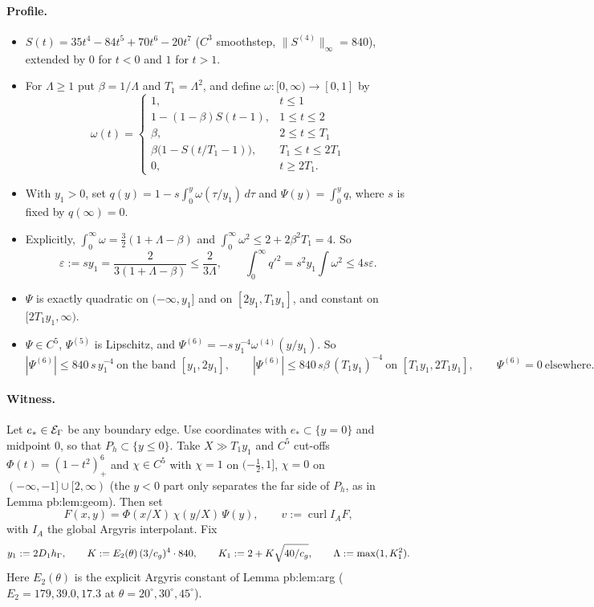 \documentclass[11pt]{article}
\theoremstyle{remark}\newtheorem{remark}[theorem]{Remark}
\newcommand{\norm}[1]{\|#1\|}\newcommand{\ip}[2]{\langle #1,#2\rangle}\DeclareMathOperator{\curl}{curl}\DeclareMathOperator{\diam}{diam}
\begin{document}
\paragraph{Profile.}
\begin{itemize}
\item $S(t)=35t^4-84t^5+70t^6-20t^7$ ($C^3$ smoothstep, $\norm{S^{(4)}}_\infty=840$), extended by $0$ for $t<0$ and $1$ for
  $t>1$.
\item For $\Lambda\ge1$ put $\beta=1/\Lambda$ and $T_1=\Lambda^2$, and define $\omega:[0,\infty)\to[0,1]$ by
\[\omega(t)=\begin{cases}1,&t\le1\\ 1-(1-\beta)S(t-1),&1\le t\le2\\ \beta,&2\le t\le T_1\\ \beta\bigl(1-S(t/T_1-1)\bigr),&T_1\le t\le2T_1\\ 0,&t\ge2T_1 .\end{cases}\]
\item With $y_1>0$, set $q(y)=1-s\int_0^y\omega(\tau/y_1)\,d\tau$ and $\Psi(y)=\int_0^yq$, where $s$ is fixed by $q(\infty)=0$.
\item Explicitly, $\int_0^\infty\omega=\frac32(1+\Lambda-\beta)$ and $\int_0^\infty\omega^2\le2+2\beta^2T_1=4$. So
\[\varepsilon:=sy_1=\frac{2}{3(1+\Lambda-\beta)}\le\frac2{3\Lambda},\qquad \int_0^\infty q'^2=s^2y_1\!\int\omega^2\le4s\varepsilon .\]
\item $\Psi$ is exactly quadratic on $(-\infty,y_1]$ and on $[2y_1,T_1y_1]$, and constant on $[2T_1y_1,\infty)$.
\item $\Psi\in C^5$, $\Psi^{(5)}$ is Lipschitz, and $\Psi^{(6)}=-s\,y_1^{-4}\omega^{(4)}(y/y_1)$. So
\[|\Psi^{(6)}|\le840\,s\,y_1^{-4}\ \text{on the band } [y_1,2y_1],\qquad |\Psi^{(6)}|\le840\,s\beta\,(T_1y_1)^{-4}\ \text{on }[T_1y_1,2T_1y_1],\qquad \Psi^{(6)}=0\ \text{elsewhere}.\]
\end{itemize}

\paragraph{Witness.} Let $e_\ast\in\mathcal E_\Gamma$ be any boundary edge. Use coordinates with $e_\ast\subset\{y=0\}$ and midpoint $0$, so
that $P_h\subset\{y\le0\}$. Take $X\gg T_1y_1$ and $C^5$ cut-offs $\Phi(t)=(1-t^2)^6_+$ and $\chi\in C^5$ with $\chi=1$ on
$(-\frac12,1]$, $\chi=0$ on $(-\infty,-1]\cup[2,\infty)$ (the $y<0$ part only separates the far side of $P_h$, as in
Lemma pb:lem:geom). Then set
\[F(x,y)=\Phi(x/X)\,\chi(y/X)\,\Psi(y),\qquad v:=\curl I_AF,\]
with $I_A$ the global Argyris interpolant. Fix
\[y_1:=2D_1h_\Gamma,\qquad K:=E_2(\theta)\,(3/c_g)^4\cdot840,\qquad K_1:=2+K\sqrt{40/c_g},\qquad \Lambda:=\max(1,K_1^2) .\]
Here $E_2(\theta)$ is the explicit Argyris constant of Lemma pb:lem:arg ($E_2=179,39.0,17.3$ at
$\theta=20^\circ,30^\circ,45^\circ$).
\end{document}
